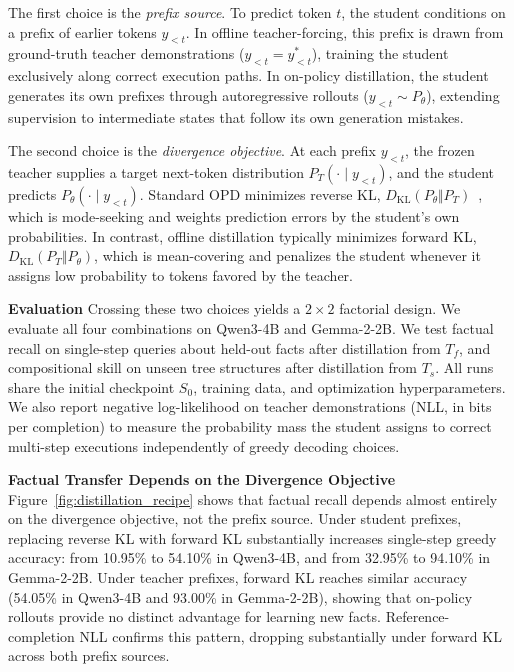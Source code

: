 \documentclass[]{template}
\theoremstyle{plain}
\theoremstyle{definition}
\theoremstyle{remark}
\renewcommand{\paragraph}[1]{\vspace{1mm}\noindent\textbf{#1}}
\begin{document}
The first choice is the \emph{prefix source}. To predict token $t$, the student conditions on a prefix of earlier tokens $y_{<t}$. In offline teacher-forcing, this prefix is drawn from ground-truth teacher demonstrations ($y_{<t} = y^*_{<t}$), training the student exclusively along correct execution paths. In on-policy distillation, the student generates its own prefixes through autoregressive rollouts ($y_{<t} \sim P_\theta$), extending supervision to intermediate states that follow its own generation mistakes.


The second choice is the \emph{divergence objective}. At each prefix $y_{<t}$, the frozen teacher supplies a target next-token distribution $P_T(\cdot \mid y_{<t})$, and the student predicts $P_\theta(\cdot \mid y_{<t})$. Standard OPD minimizes reverse KL, $D_{\mathrm{KL}}(P_\theta\Vert P_T)$~\citep{gu2024minillm,lu2025onpolicydistillation}, which is mode-seeking and weights prediction errors by the student's own probabilities. In contrast, offline distillation typically minimizes forward KL, $D_{\mathrm{KL}}(P_T\Vert P_\theta)$, which is mean-covering and penalizes the student whenever it assigns low probability to tokens favored by the teacher.


\paragraph{Evaluation}
Crossing these two choices yields a $2\times2$ factorial design. We evaluate all four combinations on Qwen3-4B and Gemma-2-2B. We test factual recall on single-step queries about held-out facts after distillation from $T_f$, and compositional skill on unseen tree structures after distillation from $T_s$. All runs share the initial checkpoint $S_0$, training data, and optimization hyperparameters. We also report negative log-likelihood on teacher demonstrations (NLL, in bits per completion) to measure the probability mass the student assigns to correct multi-step executions independently of greedy decoding choices.

\paragraph{Factual Transfer Depends on the Divergence Objective}
Figure~\ref{fig:distillation_recipe} shows that factual recall depends almost entirely on the divergence objective, not the prefix source. Under student prefixes, replacing reverse KL with forward KL substantially increases single-step greedy accuracy: from 10.95\% to 54.10\% in Qwen3-4B, and from 32.95\% to 94.10\% in Gemma-2-2B. Under teacher prefixes, forward KL reaches similar accuracy (54.05\% in Qwen3-4B and 93.00\% in Gemma-2-2B), showing that on-policy rollouts provide no distinct advantage for learning new facts. Reference-completion NLL confirms this pattern, dropping substantially under forward KL across both prefix sources.
\end{document}
